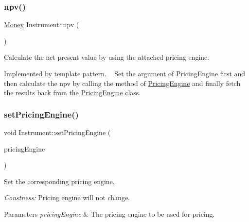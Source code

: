 \hypertarget{class_instrument_aa750f2ae95a21d65a073da3171e8d084}{}\label{class_instrument_aa750f2ae95a21d65a073da3171e8d084} 
\subsubsection{\texorpdfstring{npv()}{npv()}}
{\footnotesize\ttfamily \hyperlink{_name_def_8h_a5a9d48c16a694e9a2d9f1eca730dc8c5}{Money} Instrument\+::npv (\begin{DoxyParamCaption}{ }\end{DoxyParamCaption})}



Calculate the net present value by using the attached pricing engine. 

Implemented by template pattern. ~\newline
Set the argument of \hyperlink{class_pricing_engine}{Pricing\+Engine} first and then calculate the npv by calling the method of \hyperlink{class_pricing_engine}{Pricing\+Engine} and finally fetch the results back from the \hyperlink{class_pricing_engine}{Pricing\+Engine} class. \hypertarget{class_instrument_a47bdaa9390ab5e0616e8499a507c50cd}{}\label{class_instrument_a47bdaa9390ab5e0616e8499a507c50cd} 
\subsubsection{\texorpdfstring{set\+Pricing\+Engine()}{setPricingEngine()}}
{\footnotesize\ttfamily void Instrument\+::set\+Pricing\+Engine (\begin{DoxyParamCaption}\item[{const std\+::shared\+\_\+ptr$<$ \hyperlink{class_pricing_engine}{Pricing\+Engine} $>$}]{pricing\+Engine }\end{DoxyParamCaption})}



Set the corresponding pricing engine. 

{\itshape Constness\+:} Pricing engine will not change. 
\begin{DoxyParams}{Parameters}
{\em pricing\+Engine} & The pricing engine to be used for pricing. ~\newline
\\
\hline
\end{DoxyParams}
\hypertarget{class_instrument_a5cd384be384fe415f09ecc78e2a87539}{}\label{class_instrument_a5cd384be384fe415f09ecc78e2a87539} 
